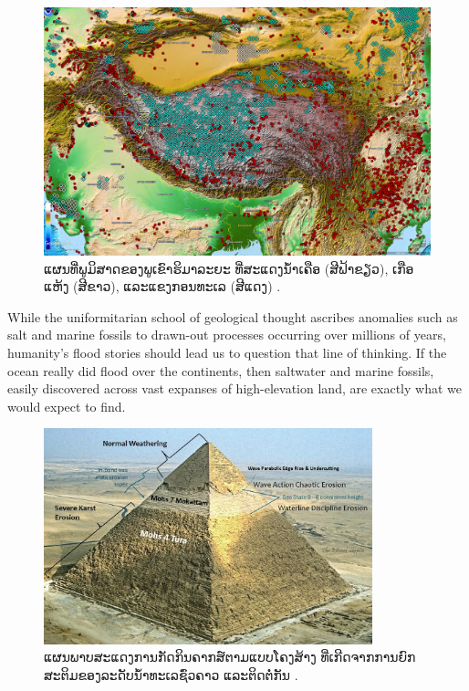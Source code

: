 \documentclass[10pt,twocolumn,letterpaper]{article}
\begin{document}
\begin{figure}[t]
\begin{center}
   \includegraphics[width=1\linewidth]{tibet.jpg}
\end{center}
   \caption{ແຜນທີ່ພູມິສາດຂອງພູເຂົາຮິມາລະຍະ ທີ່ສະແດງນ້ຳເຄືອ (ສີຟ້າຂຽວ), ເກືອແຫ້ງ (ສີຂາວ), ແລະແຂງກອນທະເລ (ສີແດງ) \cite{15,16,86,87}.}
\label{fig:3}
\label{fig:onecol}
\end{figure}

While the uniformitarian school of geological thought ascribes anomalies such as salt and marine fossils to drawn-out processes occurring over millions of years, humanity's flood stories should lead us to question that line of thinking. If the ocean really did flood over the continents, then saltwater and marine fossils, easily discovered across vast expanses of high-elevation land, are exactly what we would expect to find.

\begin{figure}[t]
\begin{center}
\includegraphics[width=0.85\textwidth]{khafre.jpg}
\end{center}
   \caption{ແຜນພາບສະແດງການກັດກິນຄາກສ໌ຕາມແບບໂຄງສ້າງ ທີ່ເກີດຈາກການຍົກສະຕິມຂອງລະດັບນ້ຳທະເລຊົ່ວຄາວ ແລະຕິດຕໍ່ກັນ \cite{27}.}
\label{fig:4}

\end{figure}
\end{document}
